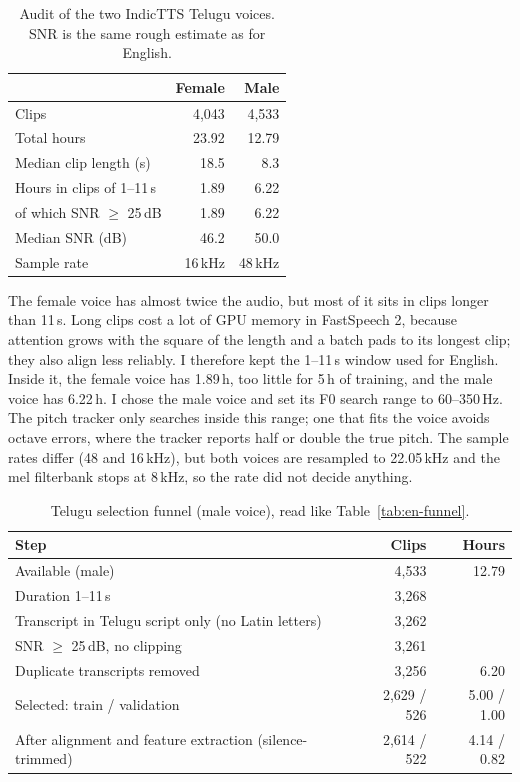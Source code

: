 \documentclass[11pt,a4paper]{article}
\begin{document}
\begin{table}[H]\centering\small
\caption{Audit of the two IndicTTS Telugu voices. SNR is the same rough estimate as for English.}
\label{tab:te-audit}
\begin{tabular}{@{}lrr@{}}
\toprule
 & Female & Male \\
\midrule
Clips & 4,043 & 4,533 \\
Total hours & 23.92 & 12.79 \\
Median clip length (s) & 18.5 & 8.3 \\
Hours in clips of 1--11\,s & 1.89 & 6.22 \\
\quad of which SNR $\geq$ 25\,dB & 1.89 & 6.22 \\
Median SNR (dB) & 46.2 & 50.0 \\
Sample rate & 16\,kHz & 48\,kHz \\
\bottomrule
\end{tabular}
\end{table}

The female voice has almost twice the audio, but most of it sits in clips longer than 11\,s. Long clips cost a lot
of GPU memory in FastSpeech 2, because attention grows with the square of the length and a batch pads to its
longest clip; they also align less reliably. I therefore kept the 1--11\,s window used for English. Inside it, the
female voice has 1.89\,h, too little for 5\,h of training, and the male voice has 6.22\,h. I chose the male voice
and set its F0 search range to 60--350\,Hz. The pitch tracker only searches inside this range; one that fits the
voice avoids octave errors, where the tracker reports half or double the true pitch. The sample rates differ (48 and 16\,kHz), but both voices are resampled
to 22.05\,kHz and the mel filterbank stops at 8\,kHz, so the rate did not decide anything.

\begin{table}[H]\centering\small
\caption{Telugu selection funnel (male voice), read like Table~\ref{tab:en-funnel}.}
\label{tab:te-funnel}
\begin{tabular}{@{}lrr@{}}
\toprule
Step & Clips & Hours \\
\midrule
Available (male) & 4,533 & 12.79 \\
Duration 1--11\,s & 3,268 & \\
Transcript in Telugu script only (no Latin letters) & 3,262 & \\
SNR $\geq$ 25\,dB, no clipping & 3,261 & \\
Duplicate transcripts removed & 3,256 & 6.20 \\
\midrule
Selected: train / validation & 2,629 / 526 & 5.00 / 1.00 \\
After alignment and feature extraction (silence-trimmed) & 2,614 / 522 & 4.14 / 0.82 \\
\bottomrule
\end{tabular}
\end{table}
\end{document}
